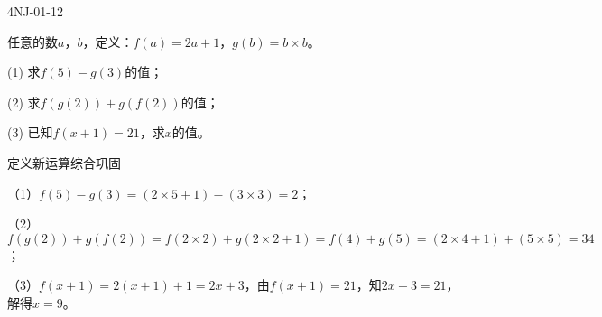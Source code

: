 \begin{defproblem}{4NJ-01-12}%
\begin{onlyproblem}%
任意的数$a$，$b$，定义：$f(a)=2a+1$，$g(b)=b\times b$。

(1) 求$f(5)-g(3)$的值；

(2) 求$f(g(2))+g(f(2))$的值；

(3) 已知$f(x+1)=21$，求$x$的值。


\end{onlyproblem}%
\begin{onlysolution}%
定义新运算综合巩固

（1）$f(5)-g(3)=(2\times 5+1)-(3\times 3)=2$；

（2）$f(g(2))+g(f(2))=f(2\times 2)+g(2\times 2+1)=f(4)+g(5)=(2\times 4+1)+(5\times 5)=34$；

（3）$f(x+1)=2(x+1)+1=2x+3$，由$f(x+1)=21$，知$2x+3=21$，解得$x=9$。

\end{onlysolution}%
\end{defproblem}








